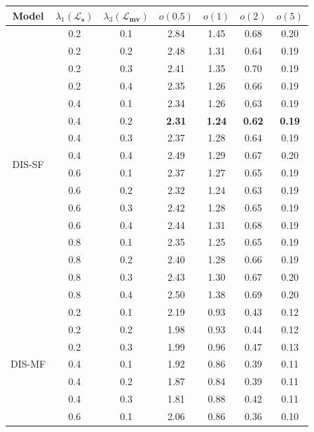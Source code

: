 \begin{table}[!t]
    \begin{center}
        \begin{tabular}{c|cc|cccc}
        \hline
        Model & $\lambda_{1} (\boldsymbol{\mathcal{L}_s})$ & $\lambda_{3} (\boldsymbol{\mathcal{L}_{mv}})$ & $o(0.5)$ & $o(1)$ & $o(2)$ & $o(5)$ \\
        \hline
        \multirow{16}{75pt}{\centering DIS-SF} & 0.2 & 0.1 & 2.84 & 1.45 & 0.68 & 0.20 \\
        & 0.2 & 0.2 & 2.48 & 1.31 & 0.64 & 0.19 \\
        & 0.2 & 0.3 & 2.41 & 1.35 & 0.70 & 0.19 \\
        & 0.2 & 0.4 & 2.35 & 1.26 & 0.66 & 0.19 \\
        & 0.4 & 0.1 & 2.34 & 1.26 & 0.63 & 0.19 \\
        & 0.4 & 0.2 & \textbf{2.31} & \textbf{1.24} & \textbf{0.62} & \textbf{0.19} \\
        & 0.4 & 0.3 & 2.37 & 1.28 & 0.64 & 0.19 \\
        & 0.4 & 0.4 & 2.49 & 1.29 & 0.67 & 0.20 \\
        & 0.6 & 0.1 & 2.37 & 1.27 & 0.65 & 0.19 \\
        & 0.6 & 0.2 & 2.32 & 1.24 & 0.63 & 0.19 \\
        & 0.6 & 0.3 & 2.42 & 1.28 & 0.65 & 0.19 \\
        & 0.6 & 0.4 & 2.44 & 1.31 & 0.68 & 0.19 \\
        & 0.8 & 0.1 & 2.35 & 1.25 & 0.65 & 0.19 \\
        & 0.8 & 0.2 & 2.40 & 1.28 & 0.66 & 0.19 \\
        & 0.8 & 0.3 & 2.43 & 1.30 & 0.67 & 0.20 \\
        & 0.8 & 0.4 & 2.50 & 1.38 & 0.69 & 0.20 \\
        \hline
        \hline
        \multirow{15}{75pt}{\centering DIS-MF} & 0.2 & 0.1 & 2.19 & 0.93 & 0.43 & 0.12 \\
        & 0.2 & 0.2 & 1.98 & 0.93 & 0.44 & 0.12 \\
        & 0.2 & 0.3 & 1.99 & 0.96 & 0.47 & 0.13 \\
        & 0.4 & 0.1 & 1.92 & 0.86 & 0.39 & 0.11 \\
        & 0.4 & 0.2 & 1.87 & 0.84 & 0.39 & 0.11 \\
        & 0.4 & 0.3 & 1.81 & 0.88 & 0.42 & 0.11 \\
        & 0.6 & 0.1 & 2.06 & 0.86 & 0.36 & 0.10 \\

\end{tabular}
\end{center}
\end{table}
